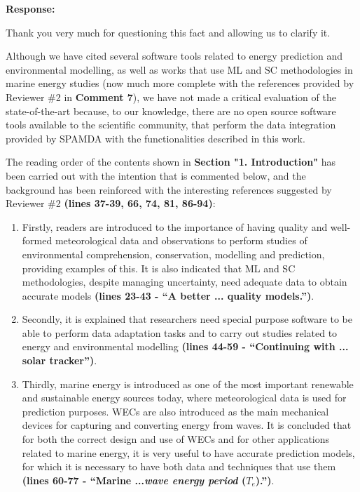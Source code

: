 \documentclass[a4paper,twoside,11pt]{article}
\begin{document}
\textbf{Response:}
{
Thank you very much for questioning this fact and allowing us to clarify it.

Although we have cited several software tools related to energy prediction and environmental modelling, as well as works that use ML and SC methodologies in marine energy studies (now much more complete with the references provided by Reviewer \#2 in \textbf{Comment 7}), we have not made a critical evaluation of the state-of-the-art because, to our knowledge, there are no open source software tools available to the scientific community, that perform the data integration provided by SPAMDA with the functionalities described in this work.

The reading order of the contents shown in \textbf{Section "1. Introduction"} has been carried out with the intention that is commented below, and the background has been reinforced with the interesting references suggested by Reviewer \#2 \textbf{(lines 37-39, 66, 74, 81, 86-94)}:
\begin{enumerate}
    \item Firstly, readers are introduced to the importance of having quality and well-formed meteorological data and observations to perform studies of environmental comprehension, conservation, modelling and prediction, providing examples of this. It is also indicated that ML and SC methodologies, despite managing uncertainty, need adequate data to obtain accurate models \textbf{(lines 23-43 - ``A better ... quality models.'')}.
       
    \item Secondly, it is explained that researchers need special purpose software to be able to perform data adaptation tasks and to carry out studies related to energy and environmental modelling  \textbf{(lines 44-59 - ``Continuing with ... solar tracker'')}.
    
    \item Thirdly, marine energy is introduced as one of the most important renewable and sustainable energy sources today, where meteorological data is used for prediction purposes. WECs are also introduced as the main mechanical devices for capturing and converting energy from waves. It is concluded that for both the correct design and use of WECs and for other applications related to marine energy, it is very useful to have accurate prediction models, for which it is necessary to have both data and techniques that use them \textbf{(lines 60-77 - ``Marine ...\textit{wave energy period} ($T_e$).'')}.
    

\end{enumerate}}
\end{document}
